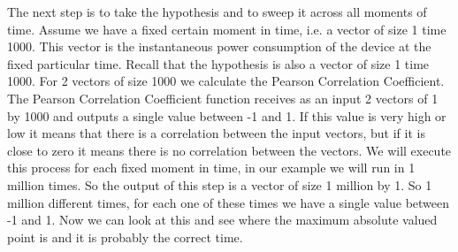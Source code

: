 The next step is to take the hypothesis and to sweep it across all moments of time. Assume we have a fixed certain moment in time, i.e. a vector of size 1 time 1000. This vector is the instantaneous power consumption of the device at the fixed particular time. Recall that the hypothesis is also a vector of size 1 time 1000. For 2 vectors of size 1000 we calculate the Pearson Correlation Coefficient. The Pearson Correlation Coefficient function receives as an input 2 vectors of 1 by 1000 and outputs a single value between -1 and 1. If this value is very high or low it means that there is a correlation between the input vectors, but if it is close to zero it means there is no correlation between the vectors. We will execute this process for each fixed moment in time, in our example we will run in 1 million times. So the output of this step is a vector of size 1 million by 1. So 1 million different times, for each one of these times we have a single value between -1 and 1. Now we can look at this and see where the maximum absolute valued point is and it is probably the correct time.

